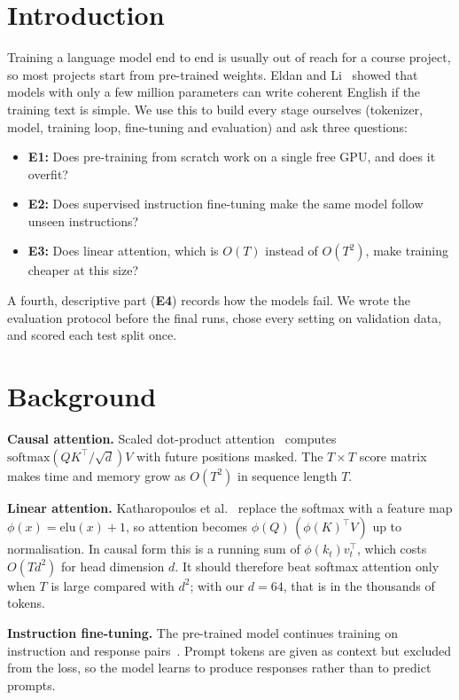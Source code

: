 \documentclass[conference]{IEEEtran}
\begin{document}
\section{Introduction}
Training a language model end to end is usually out of reach for a course project, so most projects start from
pre-trained weights. Eldan and Li~\cite{tinystories} showed that models with only a few million parameters can write
coherent English if the training text is simple. We use this to build every stage ourselves (tokenizer, model,
training loop, fine-tuning and evaluation) and ask three questions:
\begin{itemize}
\item \textbf{E1:} Does pre-training from scratch work on a single free GPU, and does it overfit?
\item \textbf{E2:} Does supervised instruction fine-tuning make the same model follow unseen instructions?
\item \textbf{E3:} Does linear attention, which is $O(T)$ instead of $O(T^2)$, make training cheaper at this size?
\end{itemize}
A fourth, descriptive part (\textbf{E4}) records how the models fail. We wrote the evaluation protocol before the
final runs, chose every setting on validation data, and scored each test split once.

\section{Background}
\textbf{Causal attention.} Scaled dot-product attention~\cite{vaswani} computes
$\mathrm{softmax}(QK^\top/\sqrt{d})V$ with future positions masked. The $T\times T$ score matrix makes time and
memory grow as $O(T^2)$ in sequence length $T$.

\textbf{Linear attention.} Katharopoulos et al.~\cite{katharopoulos} replace the softmax with a feature map
$\phi(x)=\mathrm{elu}(x)+1$, so attention becomes $\phi(Q)\,(\phi(K)^\top V)$ up to normalisation. In causal form
this is a running sum of $\phi(k_t)v_t^\top$, which costs $O(T d^2)$ for head dimension $d$. It should therefore beat
softmax attention only when $T$ is large compared with $d^2$; with our $d=64$, that is in the thousands of tokens.

\textbf{Instruction fine-tuning.} The pre-trained model continues training on instruction and response
pairs~\cite{ouyang}. Prompt tokens are given as context but excluded from the loss, so the model learns to produce
responses rather than to predict prompts.
\end{document}
